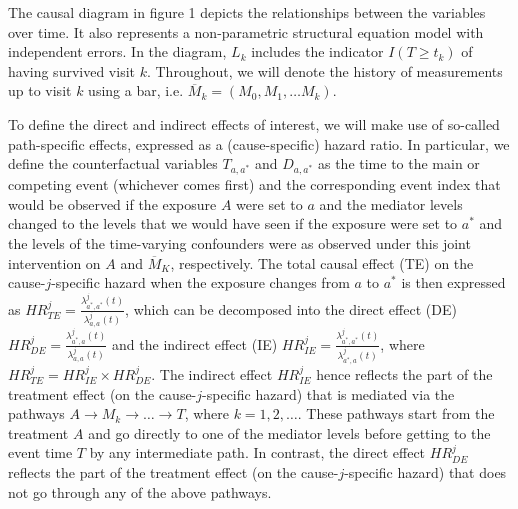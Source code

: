 \documentclass[AMA,STIX1COL]{WileyNJD-v2}
\begin{document}
The causal diagram in figure 1 depicts the relationships between the variables over time. It also represents a non-parametric structural equation model with independent errors. In the diagram, $L_k$ includes the indicator $I(T\ge t_k)$ of having survived visit $k$. Throughout, we will denote the history of measurements up to visit $k$ using a bar, i.e. $\overline{M}_k = (M_0, M_1,\ldots M_k)$.

To define the direct and indirect effects of interest, we will make use of so-called path-specific effects, expressed as a (cause-specific) hazard ratio. In particular, we define the counterfactual variables $T_{a,a^*}$ and $D_{a,a^*}$ as the time to the main or competing event (whichever comes first) and the corresponding event index that would be observed if the exposure $A$ were set to $a$ and the mediator levels changed to the levels that we would have seen if the exposure were set to $a^*$ and the levels of the time-varying confounders were as observed under this joint intervention on $A$ and $\overline{M}_K$, respectively. 
The total causal effect (TE) on the cause-$j$-specific hazard when the exposure changes from $a$ to $a^*$ is then expressed as
$ HR^j_{TE} = \frac{\lambda^j_{a^*, a^*}(t)}{\lambda^j_{a, a}(t)}$, which can be decomposed into the direct effect (DE) $HR^j_{DE} = \frac{\lambda^j_{a^*, a}(t)}{\lambda^j_{a, a}(t)}$ and the indirect effect (IE) $HR^j_{IE} = \frac{\lambda^j_{a^*, a^*}(t)}{\lambda^j_{a^*, a}(t)}$, where $HR^j_{TE} = HR^j_{IE}\times HR^j_{DE}$. The indirect effect $HR^j_{IE} $ hence reflects the part of the treatment effect (on the cause-$j$-specific hazard) that is mediated via the pathways $A \rightarrow M_k \rightarrow \ldots \rightarrow T$, where $k = 1, 2,\ldots$. These pathways start from the treatment $A$ and go directly to one of the mediator levels before getting to the event time $T$ by any intermediate path. In contrast, the direct effect $HR^j_{DE} $ reflects the part of the treatment effect (on the cause-$j$-specific hazard) that does not go through any of the above pathways.\\
\end{document}
